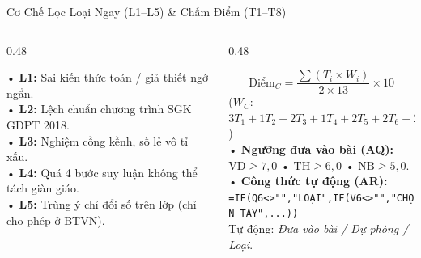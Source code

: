 \documentclass[aspectratio=169,11pt]{beamer}
\begin{document}
\begin{frame}{Cơ Chế Lọc Loại Ngay (L1–L5) \& Chấm Điểm (T1–T8)}
  \begin{columns}[T]
    \begin{column}{0.48\textwidth}
      \begin{tcolorbox}[dangercard, title=Bộ Lọc Loại Ngay L1–L5 (Cột Q)]
        \scriptsize
        • \textbf{L1:} Sai kiến thức toán / giả thiết ngớ ngẩn.\\[2pt]
        • \textbf{L2:} Lệch chuẩn chương trình SGK GDPT 2018.\\[2pt]
        • \textbf{L3:} Nghiệm cồng kềnh, số lẻ vô tỉ xấu.\\[2pt]
        • \textbf{L4:} Quá 4 bước suy luận không thể tách giàn giáo.\\[2pt]
        • \textbf{L5:} Trùng ý chỉ đổi số trên lớp (chỉ cho phép ở BTVN).
      \end{tcolorbox}
    \end{column}

    \begin{column}{0.48\textwidth}
      \begin{tcolorbox}[successcard, title=Công Thức Chấm Điểm Lớp C (Cột AN \& AR)]
        \scriptsize
        \vspace{-2pt}
        {\footnotesize \[ \text{Điểm}_C = \frac{\sum (T_i \times W_i)}{2 \times 13} \times 10 \]}
        \vspace{-4pt}
        {\tiny ($W_C$: $3T_1 + 1T_2 + 2T_3 + 1T_4 + 2T_5 + 2T_6 + 2T_7 + 0T_8$)}\\[2pt]
        • \textbf{Ngưỡng đưa vào bài (AQ):}\\
        $\text{VD} \ge 7{,}0$ • $\text{TH} \ge 6{,}0$ • $\text{NB} \ge 5{,}0$.\\[2pt]
        • \textbf{Công thức tự động (AR):}\\
        {\scriptsize\texttt{=IF(Q6<>"","LOẠI",IF(V6<>"","CHỌN TAY",...))}}\\[1pt]
        {\tiny Tự động: \textit{Đưa vào bài / Dự phòng / Loại}.}
      \end{tcolorbox}
    \end{column}
  \end{columns}
\end{frame}
\end{document}
